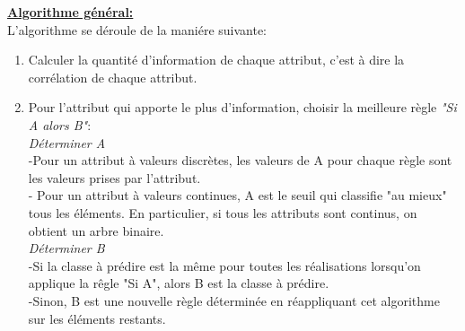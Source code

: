 \documentclass[11pt,twoside,openany,x11names,svgnames]{memoir}
\begin{document}
\begin{itemize}
		{{\large{\textbf{\underline{Algorithme général:}}}}} \\
		
		L'algorithme se déroule de la maniére suivante: \\
		\begin{enumerate}
		\item Calculer la quantité d'information de chaque attribut, c'est à dire la corrélation de chaque attribut.
		\item Pour l'attribut qui apporte le plus d'information, choisir la meilleure règle \textsl{"Si A alors B"}: \\
		\hspace{2cm} \textsl{Déterminer A} \\
		\hspace{3cm} -Pour un attribut à valeurs discrètes, les valeurs de A pour chaque règle sont les valeurs prises par l'attribut. \\
		\hspace{3cm} - Pour un attribut à valeurs continues, A est le seuil qui classifie "au mieux" tous les éléments. En particulier, si tous les attributs sont continus, on obtient un arbre binaire. \\
		\hspace{2cm} \textsl{Déterminer B} \\
		\hspace{3cm} -Si la classe à prédire est la même pour toutes les réalisations lorsqu'on applique la rêgle "Si A", alors B est la classe à prédire. \\
		\hspace{3cm} -Sinon, B est une nouvelle règle déterminée en réappliquant cet algorithme sur les éléments restants.\\
		\end{enumerate}
		

\end{itemize}
\end{document}
